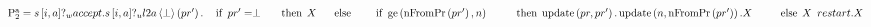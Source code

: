 $\PaTwo = \wrecvp{s}{i}{a}{accept . \urecvp{s}{i}{a}{l2a}{\perp}{pr'} .\\
\hspace*{1em}\If{pr' = \perp}\\
\hspace*{1.5em}\Then{X}\\
\hspace*{1.5em}\Else{\\
\hspace*{2em}\If{\greaterEqual{\nFromPr{pr'}}{n}}\\
\hspace*{2.5em}\Then{\update{pr}{pr'} . \update{n}{\nFromPr{pr'}}.X}\\
\hspace*{2.5em}\Else{X}}\\
\hspace*{0.5em} restart.X}$
